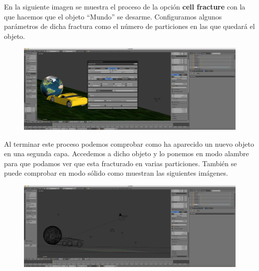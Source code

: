 \documentclass[10pt]{article}
\begin{document}
En la siguiente imagen se muestra el proceso de la opción \textbf{cell fracture} con la que hacemos que el objeto ``Mundo'' se desarme. Configuramos algunos parámetros de dicha fractura como el número de particiones en las que quedará el objeto. \\

\begin{figure}[H]
	\begin{center}
	 		\includegraphics[width = 1.00\textwidth]{Imagenes/p5-img7}
	\end{center} 
\end{figure}

Al terminar este proceso podemos comprobar como ha aparecido un nuevo objeto en una segunda capa. Accedemos a dicho objeto y lo ponemos en modo alambre para que podamos ver que esta fracturado en varias particiones. También se puede comprobar en modo sólido como muestran las siguientes imágenes. \\

\begin{figure}[H]
	\begin{center}
	 		\includegraphics[width = 1.00\textwidth]{Imagenes/p5-img8}
	\end{center} 
\end{figure}
\end{document}
